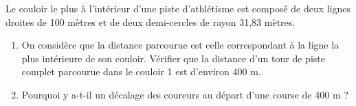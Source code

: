 \begin{exercice*}
   Le couloir le plus à l'intérieur d'une piste d'athlétisme est composé de deux lignes droites de 100 mètres et de deux demi-cercles de rayon 31,83 mètres.
\begin{enumerate}
   \item On considère que la distance parcourue est celle correspondant à la ligne la plus intérieure de son couloir. Vérifier que la distance d’un tour de piste complet parcourue dans le couloir 1 est d’environ 400 m.
  \item Pourquoi y a-t-il un décalage des coureurs au départ d’une course de 400 m ?
\end{enumerate}
\end{exercice*}